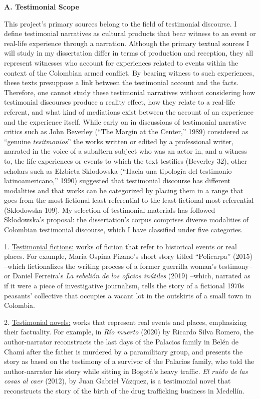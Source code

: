 \documentclass[
  11pt,
,
onecolumn,
openany
]{book}
\begin{document}
\textbf{A. Testimonial Scope}

This project's primary sources belong to the field of testimonial discourse. I
define testimonial narratives as cultural products that bear witness to an
event or real-life experience through a narration. Although the primary
textual sources I will study in my dissertation differ in terms of production
and reception, they all represent witnesses who account for experiences
related to events within the context of the Colombian armed conflict. By
bearing witness to such experiences, these texts presuppose a link between the
testimonial account and the facts. Therefore, one cannot study these
testimonial narratives without considering how testimonial discourses produce
a reality effect, how they relate to a real-life referent, and what kind of
mediations exist between the account of an experience and the experience
itself. While early on in discussions of testimonial narrative critics such as
John Beverley (``The Margin at the Center,'' 1989) considered as ``genuine
\emph{tesitmonios}'' the works written or edited by a professional writer,
narrated in the voice of a subaltern subject who was an actor in, and a
witness to, the life experiences or events to which the text testifies
(Beverley 32), other scholars such as Elzbieta Sklodowska (``Hacia una
tipología del testimonio latinoamericano,'' 1990) suggested that testimonial
discourse has different modalities and that works can be categorized by
placing them in a range that goes from the most fictional-least referential to
the least fictional-most referential (Sklodowska 109). My selection of
testimonial materials has followed Sklodowska's proposal: the dissertation's
corpus comprises diverse modalities of Colombian testimonial discourse, which
I have classified under five categories.

1. \underline{Testimonial fictions:} works of fiction that refer to historical
events or real places. For example, María Ospina Pizano's short story titled
``Policarpa'' (2015) --which fictionalizes the writing process of a former
guerrilla woman's testimony-- or Daniel Ferreira's \emph{La rebelión de los
oficios inútiles} (2019) --which, narrated as if it were a piece of
investigative journalism, tells the story of a fictional 1970s peasants'
collective that occupies a vacant lot in the outskirts of a small town in
Colombia.

2. \underline{Testimonial novels:} works that represent real events and
places, emphasizing their factuality. For example, in \emph{Río muerto} (2020)
by Ricardo Silva Romero, the author-narrator reconstructs the last days of the
Palacios family in Belén de Chamí after the father is murdered by a
paramilitary group, and presents the story as based on the testimony of a
survivor of the Palacios family, who told the author-narrator his story while
sitting in Bogotá's heavy traffic. \emph{El ruido de las cosas al caer}
(2012), by Juan Gabriel Vázquez, is a testimonial novel that reconstructs the
story of the birth of the drug trafficking business in Medellín.
\end{document}
